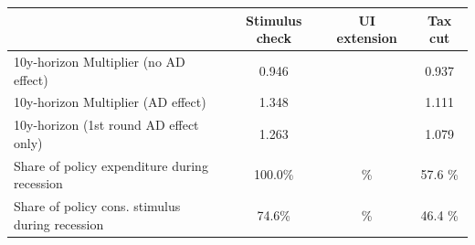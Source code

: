 \begin{tabular}{@{}lccc@{}} 
\toprule 
& Stimulus check    & UI extension    & Tax cut     \\  \midrule 
10y-horizon Multiplier (no AD effect) &0.946  &   & 0.937     \\ 
10y-horizon Multiplier (AD effect) &1.348  &   & 1.111     \\ 
10y-horizon (1st round AD effect only) &1.263  &   & 1.079     \\ 
Share of policy expenditure during recession &100.0\%  & \%  & 57.6 \%    \\ 
Share of policy cons. stimulus during recession &74.6\%  & \%  & 46.4 \%    \\ \bottomrule 
\end{tabular}  
